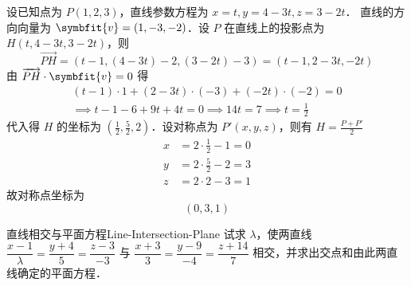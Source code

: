 \begin{solution}
    设已知点为 $P(1, 2, 3)$，直线参数方程为 $x = t, y = 4 - 3t, z = 3 - 2t$．
    直线的方向向量为 $\symbfit{v} = (1, -3, -2)$．设 $P$ 在直线上的投影点为 $H(t, 4 - 3t, 3 - 2t)$，则
    \begin{equation}
        \overrightarrow{PH} = (t - 1, (4 - 3t) - 2, (3 - 2t) - 3) = (t - 1, 2 - 3t, -2t)
    \end{equation}
    由 $\overrightarrow{PH} \cdot \symbfit{v} = 0$ 得
    \begin{equation}
        \begin{aligned}
            (t - 1) \cdot 1 + (2 - 3t) \cdot (-3) + (-2t) \cdot (-2) = 0 \\
            \implies t - 1 - 6 + 9t + 4t = 0 \implies 14t = 7 \implies t = \frac{1}{2}
        \end{aligned}
    \end{equation}
    代入得 $H$ 的坐标为 $\left( \frac{1}{2}, \frac{5}{2}, 2 \right)$．设对称点为 $P'(x, y, z)$，则有 $H = \frac{P + P'}{2}$
    \begin{equation}
        \begin{aligned}
            x & = 2 \cdot \frac{1}{2} - 1 = 0 \\
            y & = 2 \cdot \frac{5}{2} - 2 = 3 \\
            z & = 2 \cdot 2 - 3 = 1
        \end{aligned}
    \end{equation}
    故对称点坐标为
    \begin{equation}
        \boxed{(0, 3, 1)}
    \end{equation}
\end{solution}


\begin{problem}{直线相交与平面方程}{Line-Intersection-Plane}
    试求 $\lambda$，使两直线 $\dfrac{x - 1}{\lambda} = \dfrac{y + 4}{5} = \dfrac{z - 3}{-3}$ 与 $\dfrac{x + 3}{3} = \dfrac{y - 9}{-4} = \dfrac{z + 14}{7}$ 相交，并求出交点和由此两直线确定的平面方程．
\end{problem}

